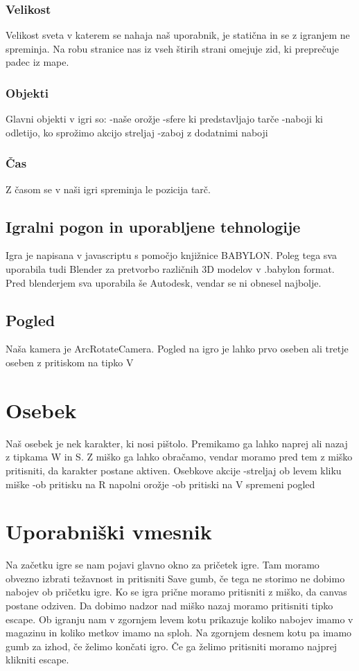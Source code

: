\documentclass[a4paper]{article}
\begin{document}
\subsubsection{Velikost}
Velikost sveta v katerem se nahaja naš uporabnik, je statična in se z igranjem ne spreminja. Na robu stranice nas iz vseh štirih strani omejuje zid, ki preprečuje padec iz mape.

\subsubsection{Objekti}
Glavni objekti v igri so:
-naše orožje
-sfere ki predstavljajo tarče
-naboji ki odletijo, ko sprožimo akcijo streljaj
-zaboj z dodatnimi naboji

\subsubsection{Čas}
Z časom se v naši igri spreminja le pozicija tarč.

\subsection{Igralni pogon in uporabljene tehnologije}
Igra je napisana v javascriptu s pomočjo knjižnice BABYLON. Poleg tega sva uporabila tudi Blender za pretvorbo različnih 3D modelov v .babylon format. 
Pred blenderjem sva uporabila še Autodesk, vendar se ni obnesel najbolje.

\subsection{Pogled}
Naša kamera je ArcRotateCamera. Pogled na igro je lahko prvo oseben ali tretje oseben z pritiskom na tipko V


\section{Osebek}
Naš osebek je nek karakter, ki nosi pištolo. Premikamo ga lahko naprej ali nazaj z tipkama W in S. Z miško ga lahko obračamo, vendar moramo pred tem z miško pritisniti, da karakter postane aktiven.
Osebkove akcije
-streljaj ob levem kliku miške
-ob pritisku na R napolni orožje
-ob pritiski na V spremeni pogled


\section{Uporabniški vmesnik}
Na začetku igre se nam pojavi glavno okno za pričetek igre. Tam moramo obvezno izbrati težavnost in pritisniti Save gumb, če tega ne storimo ne dobimo nabojev ob pričetku igre.
Ko se igra prične moramo pritisniti z miško, da canvas postane odziven. Da dobimo nadzor nad miško nazaj moramo pritisniti tipko escape. 
Ob igranju nam v zgornjem levem kotu prikazuje koliko nabojev imamo v magazinu in koliko metkov imamo na sploh. Na zgornjem desnem kotu pa imamo gumb za izhod, če želimo končati igro.
Če ga želimo pritisniti moramo najprej klikniti escape.
\end{document}
